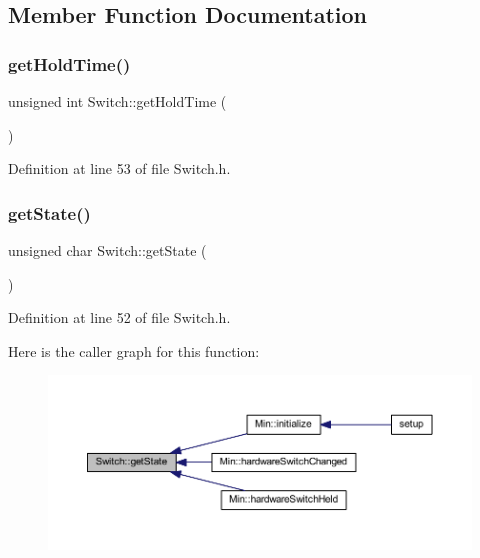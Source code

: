 \subsection{Member Function Documentation}
\mbox{\label{class_switch_ac8a0a047de62c7769c32244f68328edd}} 
\subsubsection{\texorpdfstring{get\+Hold\+Time()}{getHoldTime()}}
{\footnotesize\ttfamily unsigned int Switch\+::get\+Hold\+Time (\begin{DoxyParamCaption}{ }\end{DoxyParamCaption})\hspace{0.3cm}{\ttfamily [inline]}}



Definition at line 53 of file Switch.\+h.

\mbox{\label{class_switch_a1a4f21940769f45910075ae6df70cae9}} 
\subsubsection{\texorpdfstring{get\+State()}{getState()}}
{\footnotesize\ttfamily unsigned char Switch\+::get\+State (\begin{DoxyParamCaption}{ }\end{DoxyParamCaption})\hspace{0.3cm}{\ttfamily [inline]}}



Definition at line 52 of file Switch.\+h.

Here is the caller graph for this function\+:
\nopagebreak
\begin{figure}[H]
\begin{center}
\leavevmode
\includegraphics[width=350pt]{d9/d47/class_switch_a1a4f21940769f45910075ae6df70cae9_icgraph}
\end{center}
\end{figure}
\mbox{\label{class_switch_a403dba5cc7695d5d19e62b87e87940fe}} 
